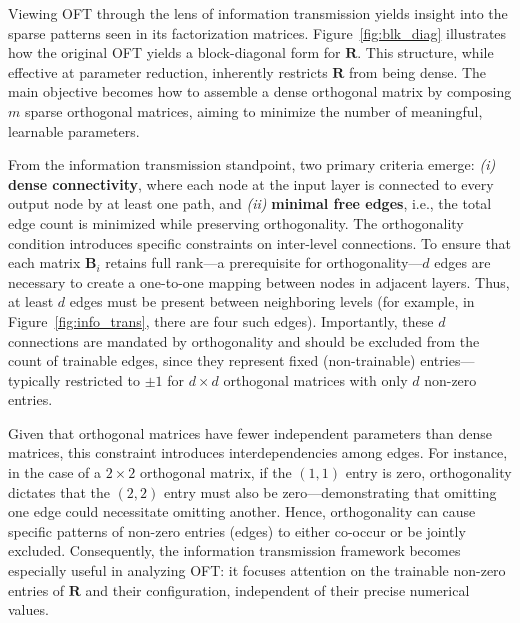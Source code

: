 Viewing OFT through the lens of information transmission yields insight into the sparse patterns seen in its factorization matrices. Figure~\ref{fig:blk_diag} illustrates how the original OFT yields a block-diagonal form for $\bm{R}$. This structure, while effective at parameter reduction, inherently restricts $\bm{R}$ from being dense. The main objective becomes how to assemble a dense orthogonal matrix by composing $m$ sparse orthogonal matrices, aiming to minimize the number of meaningful, learnable parameters.

From the information transmission standpoint, two primary criteria emerge: \emph{(i)} \textbf{dense connectivity}, where each node at the input layer is connected to every output node by at least one path, and \emph{(ii)} \textbf{minimal free edges}, i.e., the total edge count is minimized while preserving orthogonality. The orthogonality condition introduces specific constraints on inter-level connections. To ensure that each matrix $\bm{B}_i$ retains full rank—a prerequisite for orthogonality—$d$ edges are necessary to create a one-to-one mapping between nodes in adjacent layers. Thus, at least $d$ edges must be present between neighboring levels (for example, in Figure~\ref{fig:info_trans}, there are four such edges). Importantly, these $d$ connections are mandated by orthogonality and should be excluded from the count of trainable edges, since they represent fixed (non-trainable) entries—typically restricted to $\pm 1$ for $d\times d$ orthogonal matrices with only $d$ non-zero entries.

Given that orthogonal matrices have fewer independent parameters than dense matrices, this constraint introduces interdependencies among edges. For instance, in the case of a $2\times 2$ orthogonal matrix, if the $(1,1)$ entry is zero, orthogonality dictates that the $(2,2)$ entry must also be zero—demonstrating that omitting one edge could necessitate omitting another. Hence, orthogonality can cause specific patterns of non-zero entries (edges) to either co-occur or be jointly excluded. Consequently, the information transmission framework becomes especially useful in analyzing OFT: it focuses attention on the trainable non-zero entries of $\bm{R}$ and their configuration, independent of their precise numerical values.

